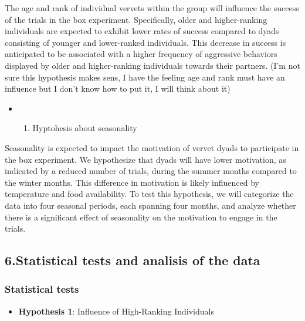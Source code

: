 \documentclass[
]{article}
\providecommand{\tightlist}{%
  \setlength{\itemsep}{0pt}\setlength{\parskip}{0pt}}
\begin{document}
The age and rank of individual vervets within the group will influence
the success of the trials in the box experiment. Specifically, older and
higher-ranking individuals are expected to exhibit lower rates of
success compared to dyads consisting of younger and lower-ranked
individuals. This decrease in success is anticipated to be associated
with a higher frequency of aggressive behaviors displayed by older and
higher-ranking individuals towards their partners. (I'm not sure this
hypothesis makes sens, I have the feeling age and rank must have an
influence but I don't know how to put it, I will think about it)

\begin{itemize}
\item
  \begin{enumerate}
  \def\labelenumi{\arabic{enumi}.}
  \setcounter{enumi}{4}
  \tightlist
  \item
    Hyptohesis about seasonality
  \end{enumerate}
\end{itemize}

Seasonality is expected to impact the motivation of vervet dyads to
participate in the box experiment. We hypothesize that dyads will have
lower motivation, as indicated by a reduced number of trials, during the
summer months compared to the winter months. This difference in
motivation is likely influenced by temperature and food availability. To
test this hypothesis, we will categorize the data into four seasonal
periods, each spanning four months, and analyze whether there is a
significant effect of seasonality on the motivation to engage in the
trials.

\hypertarget{statistical-tests-and-analisis-of-the-data}{%
\subsection{6.Statistical tests and analisis of the
data}\label{statistical-tests-and-analisis-of-the-data}}

\hypertarget{statistical-tests}{%
\subsubsection{Statistical tests}\label{statistical-tests}}

\begin{itemize}
\tightlist
\item
  \textbf{Hypothesis 1}: Influence of High-Ranking Individuals
\end{itemize}
\end{document}

